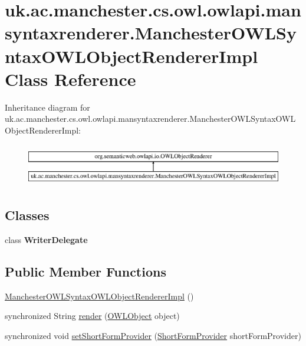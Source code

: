 \hypertarget{classuk_1_1ac_1_1manchester_1_1cs_1_1owl_1_1owlapi_1_1mansyntaxrenderer_1_1_manchester_o_w_l_syntax_o_w_l_object_renderer_impl}{\section{uk.\-ac.\-manchester.\-cs.\-owl.\-owlapi.\-mansyntaxrenderer.\-Manchester\-O\-W\-L\-Syntax\-O\-W\-L\-Object\-Renderer\-Impl Class Reference}
\label{classuk_1_1ac_1_1manchester_1_1cs_1_1owl_1_1owlapi_1_1mansyntaxrenderer_1_1_manchester_o_w_l_syntax_o_w_l_object_renderer_impl}
}
Inheritance diagram for uk.\-ac.\-manchester.\-cs.\-owl.\-owlapi.\-mansyntaxrenderer.\-Manchester\-O\-W\-L\-Syntax\-O\-W\-L\-Object\-Renderer\-Impl\-:\begin{figure}[H]
\begin{center}
\leavevmode
\includegraphics[height=1.898305cm]{classuk_1_1ac_1_1manchester_1_1cs_1_1owl_1_1owlapi_1_1mansyntaxrenderer_1_1_manchester_o_w_l_syntax_o_w_l_object_renderer_impl}
\end{center}
\end{figure}
\subsection*{Classes}
\begin{DoxyCompactItemize}
\item 
class {\bfseries Writer\-Delegate}
\end{DoxyCompactItemize}
\subsection*{Public Member Functions}
\begin{DoxyCompactItemize}
\item 
\hyperlink{classuk_1_1ac_1_1manchester_1_1cs_1_1owl_1_1owlapi_1_1mansyntaxrenderer_1_1_manchester_o_w_l_syntax_o_w_l_object_renderer_impl_adfa0708c3914c33da6d74cac3e26e94b}{Manchester\-O\-W\-L\-Syntax\-O\-W\-L\-Object\-Renderer\-Impl} ()
\item 
synchronized String \hyperlink{classuk_1_1ac_1_1manchester_1_1cs_1_1owl_1_1owlapi_1_1mansyntaxrenderer_1_1_manchester_o_w_l_syntax_o_w_l_object_renderer_impl_a3cb34f1fe2b346f67b1fa17b28bac632}{render} (\hyperlink{interfaceorg_1_1semanticweb_1_1owlapi_1_1model_1_1_o_w_l_object}{O\-W\-L\-Object} object)
\item 
synchronized void \hyperlink{classuk_1_1ac_1_1manchester_1_1cs_1_1owl_1_1owlapi_1_1mansyntaxrenderer_1_1_manchester_o_w_l_syntax_o_w_l_object_renderer_impl_aac11c68bc7ef66aed6db4c20b3860deb}{set\-Short\-Form\-Provider} (\hyperlink{interfaceorg_1_1semanticweb_1_1owlapi_1_1util_1_1_short_form_provider}{Short\-Form\-Provider} short\-Form\-Provider)
\end{DoxyCompactItemize}
